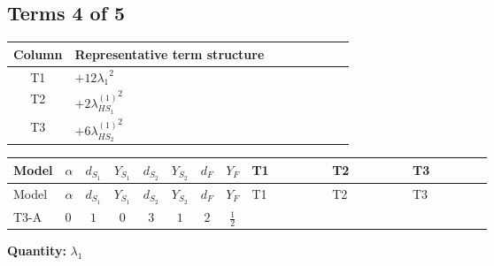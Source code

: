 \documentclass[8pt]{article}
\begin{document}
\begin{landscape}
\subsection*{Terms 4 of 5}
\begin{center}
\begin{tabular}{@{}c >{\raggedright\arraybackslash}p{0.82\linewidth}@{}}
\toprule
Column & Representative term structure \\
\midrule
T1 & \(\displaystyle +12 {\lambda_1}^2\) \\
\midrule
T2 & \(\displaystyle +2 {\lambda_{HS_1}^{(1)}}^2\) \\
\midrule
T3 & \(\displaystyle +6 {\lambda_{HS_2}^{(1)}}^2\) \\
\midrule
\bottomrule
\end{tabular}
\end{center}
\smallskip
\tiny
\begin{longtable}{@{}llcccccc >{\raggedright\arraybackslash}p{0.21\linewidth} >{\raggedright\arraybackslash}p{0.21\linewidth} >{\raggedright\arraybackslash}p{0.21\linewidth}@{}}
\toprule
Model & $\alpha$ & $d_{S_1}$ & $Y_{S_1}$ & $d_{S_2}$ & $Y_{S_2}$ & $d_F$ & $Y_F$ & T1 & T2 & T3 \\
\midrule
\endfirsthead
\toprule
Model & $\alpha$ & $d_{S_1}$ & $Y_{S_1}$ & $d_{S_2}$ & $Y_{S_2}$ & $d_F$ & $Y_F$ & T1 & T2 & T3 \\
\midrule
\endhead
T3-A & $0$ & $1$ & $0$ & $3$ & $1$ & $2$ & $\frac{1}{2}$ & \scriptsize\adjustbox{max width=\linewidth}{$\begin{gathered} +12 {\lambda_1}^2\end{gathered}$} & \scriptsize\adjustbox{max width=\linewidth}{$\begin{gathered} +2 {\lambda_{HS_1}^{(1)}}^2\end{gathered}$} & \scriptsize\adjustbox{max width=\linewidth}{$\begin{gathered} +6 {\lambda_{HS_2}^{(1)}}^2\end{gathered}$} \\
\midrule
\bottomrule
\end{longtable}
\clearpage
\noindent\textbf{Quantity: }$\lambda_1$\par\smallskip

\end{landscape}
\end{document}
